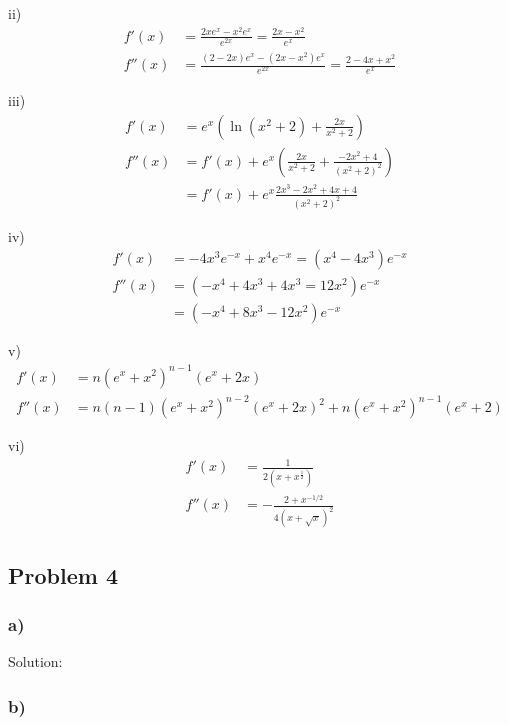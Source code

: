 \documentclass[letterpaper, 11pt]{article}
\newcommand{\1}{\mathds{1}}	%
\theoremstyle{definition}
\begin{document}
  ii)
  \begin{align*}
    f'(x)  & = \frac{2xe^{x} - x ^{2} e ^{x}}{e ^{2x}} = \frac{2x-x ^{2}}{e ^{x}}              \\
    f''(x) & = \frac{(2 - 2x)e ^{x}-(2x - x ^{2})e ^{x}}{e ^{2x}} = \frac{2-4x+x ^{2}}{e ^{x}}
  \end{align*}

  iii)
  \begin{align*}
    f'(x)  & = e ^{x}(\ln(x ^{2} + 2) + \frac{2x}{x ^{2} + 2})                                \\
    f''(x) & = f'(x) + e ^{x} (\frac{2x}{x ^{2} + 2} + \frac{-2x ^{2} + 4}{(x ^{2} + 2)^{2}}) \\
           & = f'(x) + e ^{x}\frac{2x ^{3} -2 x ^{2} + 4x + 4}{(x ^{2} + 2) ^{2}}
  \end{align*}

  iv)
  \begin{align*}
    f'(x)  & = -4x ^{3} e ^{-x} + x ^{4} e ^{-x} = (x ^{4} - 4x ^{3})e ^{-x} \\
    f''(x) & =(-x ^{4} +4x ^{3} +4x ^{3} =12 x ^{2})e ^{-x}                  \\
           & = (-x ^{4} + 8 x ^{3}- 12 x ^{2}) e ^{-x}
  \end{align*}

  v)
  \begin{align*}
    f'(x)  & = n(e ^{x} + x ^{2}) ^{n - 1} (e ^{x} + 2x)                                                    \\
    f''(x) & = n(n-1)(e ^{x} + x ^{2}) ^{n - 2} (e ^{x} + 2x)^{2} +n(e ^{x} + x ^{2}) ^{n - 1} (e ^{x} + 2)
  \end{align*}

  vi)
  \begin{align*}
    f'(x)  & = \frac{1}{2(x + x ^{\frac{1}{2}})}        \\
    f''(x) & = -\frac{2 + x ^{-1/2}}{4(x + \sqrt{x})^2}
  \end{align*}

  \subsection*{Problem 4}

  \subsubsection*{a)}

  Solution:

  \subsubsection*{b)}
\end{document}
